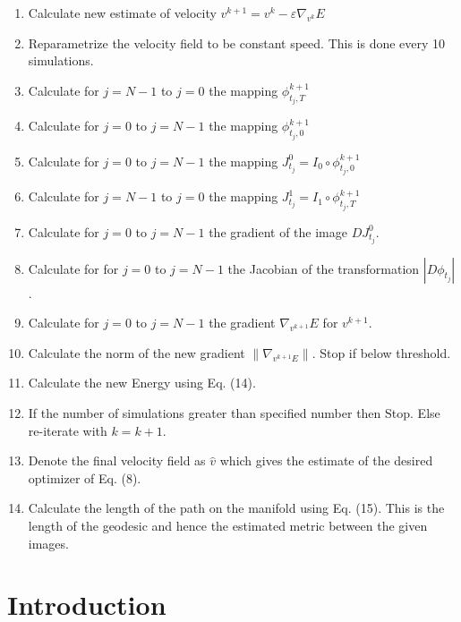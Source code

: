 \documentclass[final, paper=letter,5p,times,twocolumn]{elsarticle}
\theoremstyle{definition}
\begin{document}
{\begin{enumerate}
\item Calculate new estimate of velocity $v^{k+1} = v^{k} - \varepsilon \nabla_{v^{k}} E$
\item Reparametrize the velocity field to be constant speed. This is done every 10 simulations.
\item Calculate for $j = N-1$ to $j = 0$ the mapping $\phi_{t_{j},T}^{k+1}$
\item Calculate for $j = 0$ to $j = N-1$ the mapping $\phi_{t_{j},0}^{k+1}$
\item Calculate for $j = 0$ to $j = N-1$ the mapping $J_{t_{j}}^{0} = I_{0} \circ \phi_{t_{j},0}^{k+1}$
\item Calculate for $j = N-1$ to $j = 0$ the mapping $J_{t_{j}}^{1} = I_{1} \circ \phi_{t_{j},T}^{k+1}$
\item Calculate for $j = 0$ to $j = N-1$ the gradient of the image $DJ_{t_{j}}^{0}$.
\item Calculate for for $j = 0$ to $j = N-1$ the Jacobian of the transformation $|D \phi_{t_{j}}|$.
\item Calculate for $j = 0$ to $j = N-1$ the gradient $\nabla_{v^{k+1}}E$ for $v^{k+1}$.
\item Calculate the norm of the new gradient $\| \nabla_{v^{k+1}E} \|$. Stop if below threshold.
\item Calculate the new Energy using Eq. (14).
\item If the number of simulations greater than specified number then Stop. Else re-iterate with $k = k +1.$
\item Denote the final velocity field as $\hat{v}$ which gives the estimate of the desired optimizer of Eq. (8).
\item Calculate the length of the path on the manifold using Eq. (15). This is the length of the geodesic and hence the estimated metric between the given images.
\end{enumerate}



\section{Introduction}

}
\end{document}
